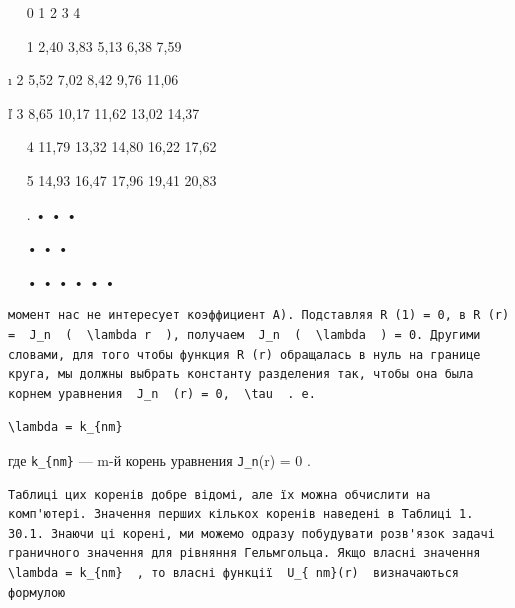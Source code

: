 \documentclass[
  ukrainian,
]{article}
\begin{document}
~~\textbar{} \textbar{} 0 \textbar{} 1 \textbar{} 2 \textbar{} 3
\textbar{} 4 \textbar{} \textbar{} \textbar{}

~~\textbar{} 1 \textbar{} 2,40 \textbar{} 3,83 \textbar{} 5,13
\textbar{} 6,38 \textbar{} 7,59 \textbar{} \textbar{} \textbar{}

ı \textbar{} 2 \textbar{} 5,52 \textbar{} 7,02 \textbar{} 8,42
\textbar{} 9,76 \textbar{} 11,06 \textbar{} \textbar{} \textbar{}

ľ \textbar{} 3 \textbar{} 8,65 \textbar{} 10,17 \textbar{} 11,62
\textbar{} 13,02 \textbar{} 14,37 \textbar{} \textbar{} \textbar{}

~~\textbar{} 4 \textbar{} 11,79 \textbar{} 13,32 \textbar{} 14,80
\textbar{} 16,22 \textbar{} 17,62 \textbar{} \textbar{} \textbar{}

~~\textbar{} 5 \textbar{} 14,93 \textbar{} 16,47 \textbar{} 17,96
\textbar{} 19,41 \textbar{} 20,83 \textbar{} \textbar{} \textbar{}

~~\textbar{} . \textbar{} • \textbar{} \textbar{} • \textbar{}
\textbar{} • \textbar{} \textbar{} \textbar{}

~~\textbar{} \textbar{} \textbar{} • \textbar{} \textbar{} • \textbar{}
• \textbar{} \textbar{} \textbar{}

~~\textbar{} • \textbar{} • \textbar{} • \textbar{} • \textbar{} •
\textbar{} • \textbar{} \textbar{} \textbar{}

\begin{verbatim}
момент нас не интересует коэффициент A). Подставляя R (1) = 0, в R (r) =  J_n  (  \lambda r  ), получаем  J_n  (  \lambda  ) = 0. Другими словами, для того чтобы функция R (r) обращалась в нуль на границе круга, мы должны выбрать константу разделения так, чтобы она была корнем уравнения  J_n  (r) = 0,  \tau  . e.
\end{verbatim}

\begin{verbatim}
\lambda = k_{nm}
\end{verbatim}

где \texttt{k\_\{nm\}} --- m-й корень уравнения \texttt{J\_n}(r) = 0 .

\begin{verbatim}
Таблиці цих коренів добре відомі, але їх можна обчислити на комп'ютері. Значення перших кількох коренів наведені в Таблиці 1. 30.1. Знаючи ці корені, ми можемо одразу побудувати розв'язок задачі граничного значення для рівняння Гельмгольца. Якщо власні значення  \lambda = k_{nm}  , то власні функції  U_{ nm}(r)  визначаються формулою
\end{verbatim}
\end{document}
